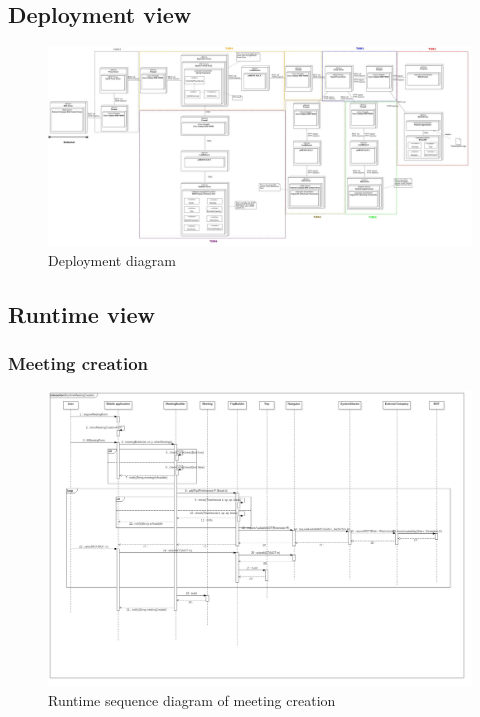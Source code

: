 \documentclass[a4paper,leqno]{article}
\begin{document}
\newpage
\subsection{Deployment view}
\begin{figure}[!h]
	\centering
	\begin{center}
		\includegraphics[scale=0.2]{TravlendarPlusDeploymentDiagramTiers_19112017_1}
	\end{center}
       \caption{Deployment diagram}
\end{figure}


\newpage
\subsection{Runtime view}

\subsubsection{Meeting creation}

\begin{figure}[!h]
	\centering
	\begin{center}
		\includegraphics[scale=0.2, angle = 90]{RuntimeMeetingCreation_191117_1}
	\end{center}
	\caption{Runtime sequence diagram of meeting creation}
\end{figure}
\end{document}
